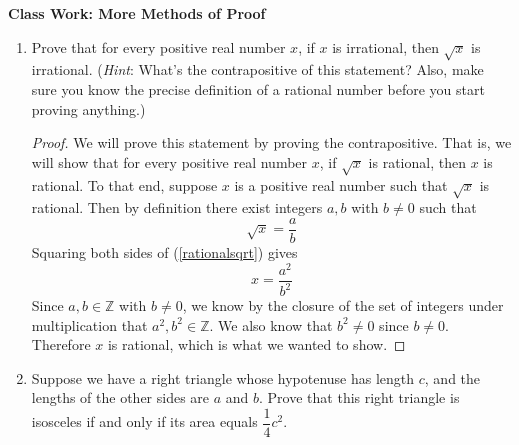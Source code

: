 \documentclass[11pt]{article}
\begin{document}
	
	\thispagestyle{empty}
	\renewcommand{\headrulewidth}{0.0pt}
	\thispagestyle{fancy}
	\lfoot{}
	\cfoot{}
	\rfoot{}	
	
	\vspace*{0in}

		\begin{center}
			\begin{large}
			\textbf{Class Work: More Methods of Proof} \\
			\end{large}
		\end{center}


\begin{enumerate}

\item Prove that for every positive real number $x$, if $x$ is irrational, then $\sqrt{x}$ is irrational. (\emph{Hint}: What's the contrapositive of this statement? Also, make sure you know the precise definition of a rational number before you start proving anything.) 

\begin{proof}
	We will prove this statement by proving the contrapositive. That is, we will show that for every positive real number $x$, if $\sqrt{x}$ is rational, then $x$ is rational. To that end, suppose $x$ is a positive real number such that $\sqrt{x}$ is rational. Then by definition there exist integers $a,b$ with $b \neq 0$ such that 
	\begin{equation}\label{rationalsqrt}
		\sqrt{x} = \frac{a}{b}
	\end{equation}
	Squaring both sides of (\ref{rationalsqrt}) gives 
	\[ x = \frac{a^2}{b^2} \]
	Since $a,b \in \mathbb{Z}$ with $b \neq 0$, we know by the closure of the set of integers under multiplication that $a^2, b^2 \in \mathbb{Z}$. We also know that $b^2 \neq 0$ since $b \neq 0$. Therefore $x$ is rational, which is what we wanted to show. 
\end{proof}



\item Suppose we have a right triangle whose hypotenuse has length $c$, and the lengths of the other sides are $a$ and $b$. Prove that this right triangle is isosceles if and only if its area equals $\dfrac{1}{4}c^2$. 


\end{enumerate}
\end{document}

